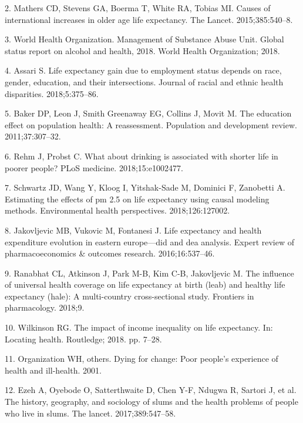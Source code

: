 \documentclass[]{elsarticle} %
\begin{document}
\leavevmode\hypertarget{ref-mathers2015causes}{}%
2. Mathers CD, Stevens GA, Boerma T, White RA, Tobias MI. Causes of international increases in older age life expectancy. The Lancet. 2015;385:540--8.

\leavevmode\hypertarget{ref-world2018global}{}%
3. World Health Organization. Management of Substance Abuse Unit. Global status report on alcohol and health, 2018. World Health Organization; 2018.

\leavevmode\hypertarget{ref-assari2018life}{}%
4. Assari S. Life expectancy gain due to employment status depends on race, gender, education, and their intersections. Journal of racial and ethnic health disparities. 2018;5:375--86.

\leavevmode\hypertarget{ref-baker2011education}{}%
5. Baker DP, Leon J, Smith Greenaway EG, Collins J, Movit M. The education effect on population health: A reassessment. Population and development review. 2011;37:307--32.

\leavevmode\hypertarget{ref-rehm2018drinking}{}%
6. Rehm J, Probst C. What about drinking is associated with shorter life in poorer people? PLoS medicine. 2018;15:e1002477.

\leavevmode\hypertarget{ref-schwartz2018estimating}{}%
7. Schwartz JD, Wang Y, Kloog I, Yitshak-Sade M, Dominici F, Zanobetti A. Estimating the effects of pm 2.5 on life expectancy using causal modeling methods. Environmental health perspectives. 2018;126:127002.

\leavevmode\hypertarget{ref-jakovljevic2016life}{}%
8. Jakovljevic MB, Vukovic M, Fontanesi J. Life expectancy and health expenditure evolution in eastern europe---did and dea analysis. Expert review of pharmacoeconomics \& outcomes research. 2016;16:537--46.

\leavevmode\hypertarget{ref-ranabhat2018influence}{}%
9. Ranabhat CL, Atkinson J, Park M-B, Kim C-B, Jakovljevic M. The influence of universal health coverage on life expectancy at birth (leab) and healthy life expectancy (hale): A multi-country cross-sectional study. Frontiers in pharmacology. 2018;9.

\leavevmode\hypertarget{ref-wilkinson2018impact}{}%
10. Wilkinson RG. The impact of income inequality on life expectancy. In: Locating health. Routledge; 2018. pp. 7--28.

\leavevmode\hypertarget{ref-world2001dying}{}%
11. Organization WH, others. Dying for change: Poor people's experience of health and ill-health. 2001.

\leavevmode\hypertarget{ref-ezeh2017history}{}%
12. Ezeh A, Oyebode O, Satterthwaite D, Chen Y-F, Ndugwa R, Sartori J, et al. The history, geography, and sociology of slums and the health problems of people who live in slums. The lancet. 2017;389:547--58.
\end{document}
